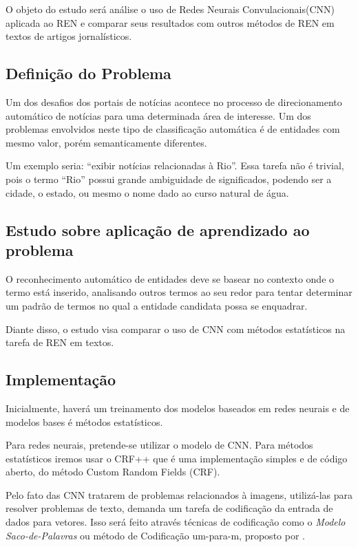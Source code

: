 \documentclass[12pt]{article}
\begin{document}
O objeto do estudo será análise o uso de Redes Neurais Convulacionais(CNN) aplicada ao REN e comparar seus resultados com outros métodos de REN em textos de artigos jornalísticos.

\subsection{Definição do Problema}

Um dos desafios dos portais de notícias acontece no processo de direcionamento automático de notícias para uma determinada área de interesse. Um dos problemas envolvidos neste tipo de classificação automática é de entidades com mesmo valor, porém semanticamente diferentes. 

Um exemplo seria: “exibir notícias relacionadas à Rio”. Essa tarefa não é trivial, pois o termo “Rio” possui grande ambiguidade  de significados, podendo ser a cidade, o estado, ou mesmo o nome dado ao curso natural de água. 

\subsection{Estudo sobre aplicação de aprendizado ao problema}
O reconhecimento automático de entidades deve se basear no contexto onde o termo está inserido, analisando outros termos ao seu redor para tentar determinar um padrão de termos no qual a entidade candidata possa se enquadrar.

Diante disso, o estudo visa comparar o uso de CNN com métodos estatísticos na tarefa de REN em textos.

\subsection{Implementação}
Inicialmente, haverá um treinamento dos modelos baseados em redes neurais e de modelos bases é métodos estatísticos.

Para redes neurais, pretende-se utilizar o modelo de CNN. Para métodos estatísticos iremos usar o CRF++ que é uma implementação simples e de código aberto, do método Custom Random Fields (CRF).

Pelo fato das CNN tratarem de problemas relacionados à imagens, utilizá-las para resolver problemas de texto, demanda um tarefa de codificação da entrada de dados para vetores. Isso será feito através técnicas de codificação como o   \emph{Modelo Saco-de-Palavras} ou método de Codificação  um-para-m, proposto por \cite{DBLP:journals/corr/ZhangL15}.
\end{document}
